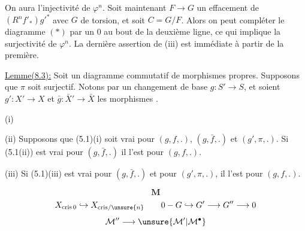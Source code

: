  On aura
l'injectivité de $\varphi^n$. Soit maintenant $F\longrightarrow G$ un effacement de $(R^nf'_*)g'^*$ avec $G$ de torsion, et soit $C=G/F$. Alors on peut compléter le diagramme $(*)$ par un $0$ au bout de la deuxième ligne, ce qui implique la surjectivité de $\varphi^n$. La dernière assertion de (iii) est immédiate à partir de la première.

\uline{Lemme(8.3):} Soit
un diagramme commutatif de morphismes propres. Supposons que $\pi$ soit surjectif. Notons par un  changement de base $g:S'\longrightarrow S$, et soient $g':X'\longrightarrow X$ et $\bar g:\bar X'\longrightarrow\bar X$ les morphismes .

(i)  

(ii) Supposons que (5.1)(i) soit vrai pour $(g,f,.)$, $(g,\bar f,.)$ et $(g',\pi,.)$. Si (5.1(ii)) est vrai pour $(g,\bar f,.)$  il l'est pour $(g,f,.)$.

(iii) Si (5.1)(iii) est vrai pour $(g,\bar f,.)$ et pour $(g',\pi,.)$, il l'est pour $(g,f,.)$.

\[\mathbf M\]
\[
X_{\mathrm{cris}\,0}\hookrightarrow X_{\mathrm{cris}/\unsure{n}}
\qquad 0\mathbin{-}G\hookrightarrow G'\longrightarrow G''\longrightarrow0
\]
\[\mathcal M''\longrightarrow\unsure{\mathcal M'|\mathcal M^\bullet}\]

